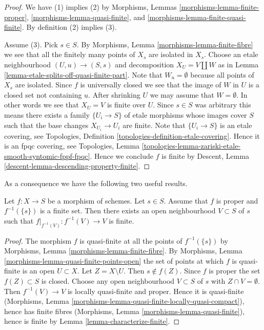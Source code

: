 \begin{proof}
We have (1) implies (2) by
Morphisms, Lemmas \ref{morphisms-lemma-finite-proper},
\ref{morphisms-lemma-quasi-finite},
and \ref{morphisms-lemma-finite-quasi-finite}.
By definition (2) implies (3).

\medskip\noindent
Assume (3). Pick $s \in S$. By
Morphisms, Lemma \ref{morphisms-lemma-finite-fibre} we
see that all the finitely many points of $X_s$ are isolated in $X_s$.
Choose an etale neighbourhood $(U, u) \to (S, s)$
and decomposition $X_U = V \coprod W$ as in
Lemma \ref{lemma-etale-splits-off-quasi-finite-part}.
Note that $W_u = \emptyset$ because all points of $X_s$ are isolated.
Since $f$ is universally closed we see that
the image of $W$ in $U$ is a closed set not containing $u$.
After shrinking $U$ we may assume that $W = \emptyset$.
In other words we see that $X_U = V$ is finite over $U$.
Since $s \in S$ was arbitrary
this means there exists a family $\{U_i \to S\}$
of etale morphisms whose images cover $S$ such that
the base changes $X_{U_i} \to U_i$ are finite.
Note that $\{U_i \to S\}$ is an etale covering,
see Topologies, Definition \ref{topologies-definition-etale-covering}.
Hence it is an fpqc covering, see
Topologies,
Lemma \ref{topologies-lemma-zariski-etale-smooth-syntomic-fppf-fpqc}.
Hence we conclude $f$ is finite by
Descent, Lemma \ref{descent-lemma-descending-property-finite}.
\end{proof}

\noindent
As a consequence we have the following two useful results.

\begin{lemma}
\label{lemma-proper-finite-fibre-finite-in-neighbourhood}
Let $f : X \to S$ be a morphism of schemes.
Let $s \in S$.
Assume that $f$ is proper and $f^{-1}(\{s\})$ is a finite set.
Then there exists an open neighbourhood $V \subset S$ of $s$
such that $f|_{f^{-1}(V)} : f^{-1}(V) \to V$ is finite.
\end{lemma}

\begin{proof}
The morphism $f$ is quasi-finite at all the points of $f^{-1}(\{s\})$
by Morphisms, Lemma \ref{morphisms-lemma-finite-fibre}.
By Morphisms, Lemma \ref{morphisms-lemma-quasi-finite-points-open} the
set of points at which $f$ is quasi-finite is an open $U \subset X$.
Let $Z = X \setminus U$. Then $s \not \in f(Z)$. Since $f$ is proper
the set $f(Z) \subset S$ is closed. Choose any open neighbourhood
$V \subset S$ of $s$ with $Z \cap V = \emptyset$. Then
$f^{-1}(V) \to V$ is locally quasi-finite and proper.
Hence it is quasi-finite
(Morphisms, Lemma \ref{morphisms-lemma-quasi-finite-locally-quasi-compact}),
hence has finite fibres
(Morphisms, Lemma \ref{morphisms-lemma-quasi-finite}), hence
is finite by Lemma \ref{lemma-characterize-finite}.
\end{proof}

